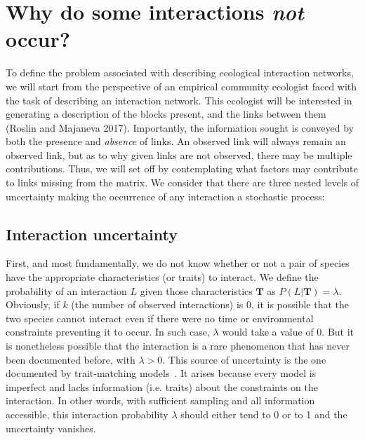 \documentclass[12pt]{article}
\begin{document}
\section*{Why do some interactions \emph{not} occur?}

  To define the problem associated with describing ecological interaction networks, we will start from the perspective of an empirical community ecologist faced with the task of describing an interaction network. This ecologist will be interested in generating a description of the blocks present, and the links between them (Roslin and Majaneva 2017).  Importantly, the information sought is conveyed by both the presence and \emph{absence} of links. An observed link will always remain an observed link, but as to why given links are not observed, there may be multiple contributions. Thus, we will set off by contemplating what factors may contribute to links missing from the matrix. We consider that there are three nested levels of uncertainty making the occurrence of any interaction a stochastic process:

    \subsection*{Interaction uncertainty} 

    First, and most fundamentally, we do not know whether or not a pair of species have the appropriate characteristics (or traits) to interact. We define the probability of an interaction $L$ given those characteristics $\mathbf{T}$ as $P(L | \mathbf{T})=\lambda$. Obviously, if $k$ (the number of observed interactions) is 0, it is possible that the two species cannot interact even if there were no time or environmental constraints preventing it to occur. In such case, $\lambda$ would take a value of 0. 
    But it is nonetheless possible that the interaction is a rare phenomenon that has never been documented before, with $\lambda>0$. This source of uncertainty is the one documented by trait-matching models~\citep{Bartomeus2016}. It arises because every model is imperfect and lacks information (i.e. traits) about the constraints on the interaction. In other words, with sufficient sampling and all information accessible, this interaction probability $\lambda$ should either tend to 0 or to 1 and the uncertainty vanishes. 
\end{document}
